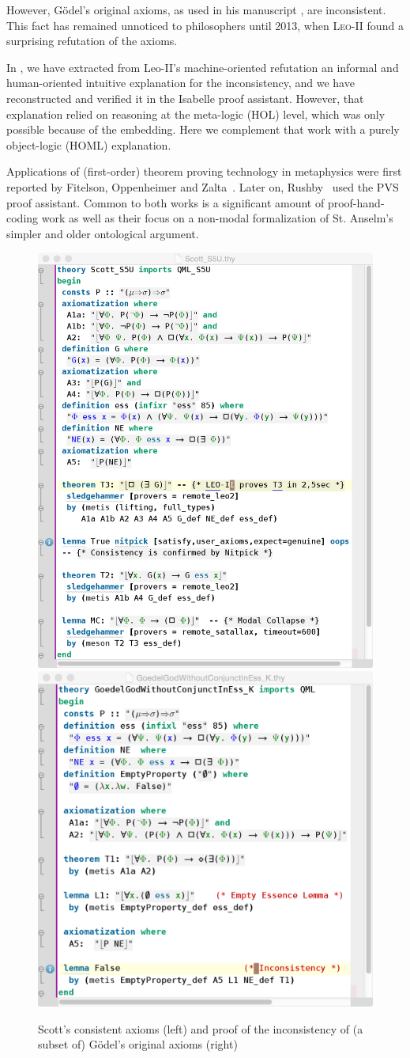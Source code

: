 \documentclass{llncs}
\newcommand{\logic}[1]{\textbf{#1}\xspace}
\newcommand{\SFiveU}{\logic{S5\textsuperscript{U}}}
\begin{document}
However, G\"odel's original axioms, as used in his
manuscript \cite{GoedelNotes}, are inconsistent. This fact has
remained unnoticed to philosophers until 2013, 
when \textsc{Leo-II} found a surprising refutation of the axioms.

In \cite{C55}, we have extracted from Leo-II's machine-oriented refutation an informal and human-oriented intuitive explanation for the inconsistency, and we have reconstructed and
verified it in the Isabelle proof assistant. However, that explanation relied on reasoning at the meta-logic (HOL) level, which was only possible because of the embedding. Here we complement that work with a purely object-logic (HOML) explanation.

Applications of (first-order) theorem proving technology in
metaphysics were first reported by Fitelson, Oppenheimer and
Zalta~\cite{FitelsonZalta,oppenheimer11}. 
Later on, Rushby~\cite{rushby13} used the \textsc{PVS} proof
assistant. Common to both works is a
significant amount of proof-hand-coding work as well as their focus on
a non-modal formalization of St. Anselm's simpler
and older ontological argument.


\begin{figure}\centering 
  \includegraphics[width=.495\textwidth]{./Scott_S5U.png}
  \includegraphics[width=.495\textwidth]{./InconsistencyIsabelleK.png}
\caption{Scott's consistent axioms (left) and proof of the
  inconsistency of (a subset of) G\"odel's original  axioms (right)}
\label{Scott_Goedel}
\end{figure} 
\end{document}
